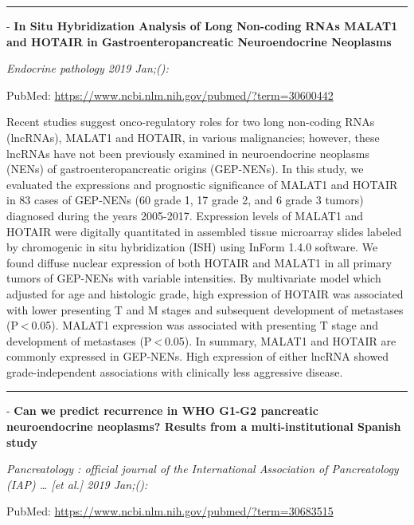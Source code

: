 \documentclass[]{article}
\begin{document}
{}

{}

\begin{center}\rule{0.5\linewidth}{\linethickness}\end{center}

 - \textbf{In Situ Hybridization Analysis of Long Non-coding RNAs MALAT1
and HOTAIR in Gastroenteropancreatic Neuroendocrine Neoplasms}

\emph{Endocrine pathology 2019 Jan;():}

PubMed: \url{https://www.ncbi.nlm.nih.gov/pubmed/?term=30600442}

Recent studies suggest onco-regulatory roles for two long non-coding
RNAs (lncRNAs), MALAT1 and HOTAIR, in various malignancies; however,
these lncRNAs have not been previously examined in neuroendocrine
neoplasms (NENs) of gastroenteropancreatic origins (GEP-NENs). In this
study, we evaluated the expressions and prognostic significance of
MALAT1 and HOTAIR in 83 cases of GEP-NENs (60 grade 1, 17 grade 2, and 6
grade 3 tumors) diagnosed during the years 2005-2017. Expression levels
of MALAT1 and HOTAIR were digitally quantitated in assembled tissue
microarray slides labeled by chromogenic in situ hybridization (ISH)
using InForm 1.4.0 software. We found diffuse nuclear expression of both
HOTAIR and MALAT1 in all primary tumors of GEP-NENs with variable
intensities. By multivariate model which adjusted for age and histologic
grade, high expression of HOTAIR was associated with lower presenting T
and M stages and subsequent development of metastases
(P \textless{} 0.05). MALAT1 expression was associated with presenting T
stage and development of metastases (P \textless{} 0.05). In summary,
MALAT1 and HOTAIR are commonly expressed in GEP-NENs. High expression of
either lncRNA showed grade-independent associations with clinically less
aggressive disease.

{}

{}

\begin{center}\rule{0.5\linewidth}{\linethickness}\end{center}

 - \textbf{Can we predict recurrence in WHO G1-G2 pancreatic
neuroendocrine neoplasms? Results from a multi-institutional Spanish
study}

\emph{Pancreatology : official journal of the International Association
of Pancreatology (IAP) \ldots{} {[}et al.{]} 2019 Jan;():}

PubMed: \url{https://www.ncbi.nlm.nih.gov/pubmed/?term=30683515}
\end{document}
